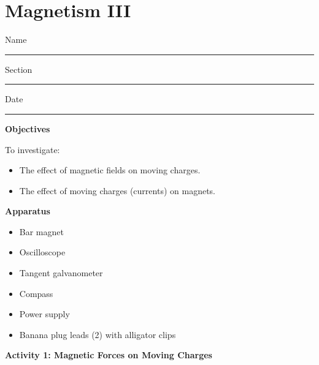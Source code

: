 
\section{Magnetism III}

Name \rule{2.0in}{0.1pt}\hfill{}Section \rule{1.0in}{0.1pt}\hfill{}Date
\rule{1.0in}{0.1pt}

\textbf{Objectives}

To investigate:

\begin{itemize}
\item The effect of magnetic fields on moving charges. 
\item The effect of moving charges (currents) on magnets. 
\end{itemize}

\textbf{Apparatus} 

\begin{itemize} 
\item Bar magnet
\item Oscilloscope
\item Tangent galvanometer
\item Compass
\item Power supply
\item Banana plug leads (2) with alligator clips
\end{itemize}





\textbf{Activity 1: Magnetic Forces on Moving Charges }

